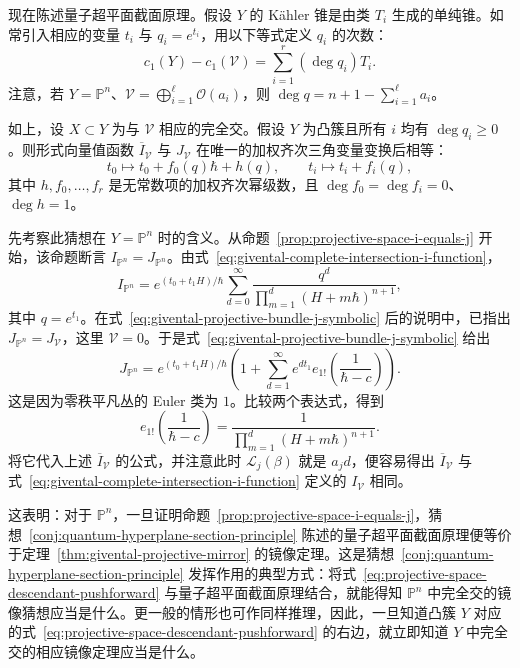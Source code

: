 现在陈述量子超平面截面原理。假设 $Y$ 的 Kähler 锥是由类 $T_i$ 生成的单纯锥。如常引入相应的变量 $t_i$ 与 $q_i=e^{t_i}$，用以下等式定义 $q_i$ 的次数：
\[
c_1(Y)-c_1(\mathcal V)=\sum_{i=1}^r(\deg q_i)T_i.
\]
注意，若 $Y=\mathbb P^n$、$\mathcal V=\bigoplus_{i=1}^{\ell}\mathcal O(a_i)$，则 $\deg q=n+1-\sum_{i=1}^{\ell}a_i$。
\begin{conjecture}\label{conj:quantum-hyperplane-section-principle}
如上，设 $X\subset Y$ 为与 $\mathcal V$ 相应的完全交。假设 $Y$ 为凸簇且所有 $i$ 均有 $\deg q_i\ge0$。则形式向量值函数 $\overline I_{\mathcal V}$ 与 $J_{\mathcal V}$ 在唯一的加权齐次三角变量变换后相等：
\[
t_0\longmapsto t_0+f_0(q)\hbar+h(q),\qquad t_i\longmapsto t_i+f_i(q),
\]
其中 $h,f_0,\ldots,f_r$ 是无常数项的加权齐次幂级数，且 $\deg f_0=\deg f_i=0$、$\deg h=1$。
\end{conjecture}
先考察此猜想在 $Y=\mathbb P^n$ 时的含义。从命题~\ref{prop:projective-space-i-equals-j} 开始，该命题断言 $I_{\mathbb P^n}=J_{\mathbb P^n}$。由式~\eqref{eq:givental-complete-intersection-i-function}，
\begin{equation}\label{eq:projective-space-i-hypergeometric}
I_{\mathbb P^n}=e^{(t_0+t_1H)/\hbar}\sum_{d=0}^{\infty}
\frac{q^d}{\prod_{m=1}^d(H+m\hbar)^{n+1}},
\end{equation}
其中 $q=e^{t_1}$。在式~\eqref{eq:givental-projective-bundle-j-symbolic} 后的说明中，已指出 $J_{\mathbb P^n}=J_{\mathcal V}$，这里 $\mathcal V=0$。于是式~\eqref{eq:givental-projective-bundle-j-symbolic} 给出
\begin{equation}\label{eq:projective-space-j-descendants}
J_{\mathbb P^n}=e^{(t_0+t_1H)/\hbar}\left(1+\sum_{d=1}^{\infty}e^{dt_1}e_{1!}\left(\frac1{\hbar-c}\right)\right).
\end{equation}
这是因为零秩平凡丛的 Euler 类为 $1$。比较两个表达式，得到
\begin{equation}\label{eq:projective-space-descendant-pushforward}
e_{1!}\left(\frac1{\hbar-c}\right)=\frac1{\prod_{m=1}^d(H+m\hbar)^{n+1}}.
\end{equation}
将它代入上述 $\overline I_{\mathcal V}$ 的公式，并注意此时 $\mathcal L_j(\beta)$ 就是 $a_jd$，便容易得出 $\overline I_{\mathcal V}$ 与式~\eqref{eq:givental-complete-intersection-i-function} 定义的 $I_{\mathcal V}$ 相同。

这表明：对于 $\mathbb P^n$，一旦证明命题~\ref{prop:projective-space-i-equals-j}，猜想~\ref{conj:quantum-hyperplane-section-principle} 陈述的量子超平面截面原理便等价于定理~\ref{thm:givental-projective-mirror} 的镜像定理。这是猜想~\ref{conj:quantum-hyperplane-section-principle} 发挥作用的典型方式：将式~\eqref{eq:projective-space-descendant-pushforward} 与量子超平面截面原理结合，就能得知 $\mathbb P^n$ 中完全交的镜像猜想应当是什么。更一般的情形也可作同样推理，因此，一旦知道凸簇 $Y$ 对应的式~\eqref{eq:projective-space-descendant-pushforward} 的右边，就立即知道 $Y$ 中完全交的相应镜像定理应当是什么。


